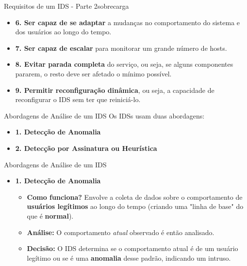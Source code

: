 \begin{frame}{Requisitos de um IDS - Parte 2}sobrecarga
    \begin{itemize}
        \item \textbf{6. Ser capaz de se adaptar} a mudanças no comportamento do sistema e dos usuários ao longo do tempo.

        \item \textbf{7. Ser capaz de escalar } para monitorar um grande número de hosts.

        \item \textbf{8. Evitar parada completa} do serviço, ou seja, se alguns componentes pararem, o resto deve ser afetado o mínimo possível.

        \item \textbf{9. Permitir reconfiguração dinâmica}, ou seja, a capacidade de reconfigurar o IDS sem ter que reiniciá-lo.
    \end{itemize}
\end{frame}

\begin{frame}{Abordagens de Análise de um IDS}
    Os IDSs usam duas abordagens:
    \begin{itemize}


        \item \textbf{1. Detecção de Anomalia}


        \item \textbf{2. Detecção por Assinatura ou Heurística }

    \end{itemize}
\end{frame}



\begin{frame}{Abordagens de Análise de um IDS}

    \begin{itemize}


        \item \textbf{1. Detecção de Anomalia}
              \begin{itemize}
                  \item \textbf{Como funciona?} Envolve a coleta de dados sobre o comportamento de \textbf{usuários legítimos} ao longo do tempo (criando uma "linha de base" do que é \textbf{normal}).
                  \item \textbf{Análise:} O comportamento \textit{atual} observado é então analisado.
                  \item \textbf{Decisão:} O IDS determina se o comportamento atual é de um usuário legítimo ou se é uma \textbf{anomalia} desse padrão, indicando um intruso.
              \end{itemize}


    \end{itemize}
\end{frame}




